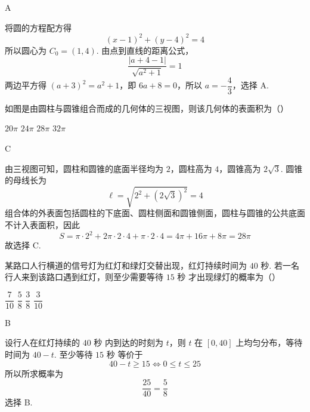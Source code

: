 \begin{answer}
A
\end{answer}

\begin{solution}
将圆的方程配方得
\[
(x-1)^2+(y-4)^2=4
\]
所以圆心为 \(C_0=(1,4)\). 由点到直线的距离公式，
\[
\frac{|a+4-1|}{\sqrt{a^2+1}}=1
\]
两边平方得 \((a+3)^2=a^2+1\)，即 \(6a+8=0\)，所以 \(a=-\dfrac43\)，选择 A.
\end{solution}


\begin{problem}
如图是由圆柱与圆锥组合而成的几何体的三视图，则该几何体的表面积为（\quad）

\begingroup
{}
\endgroup

\choices
    {\(20\pi\)}
    {\(24\pi\)}
    {\(28\pi\)}
    {\(32\pi\)}
\end{problem}

\begin{answer}
C
\end{answer}

\begin{solution}
由三视图可知，圆柱和圆锥的底面半径均为 \(2\)，圆柱高为 \(4\)，圆锥高为 \(2\sqrt3\). 圆锥的母线长为
\[
\ell=\sqrt{2^2+(2\sqrt3)^2}=4
\]
组合体的外表面包括圆柱的下底面、圆柱侧面和圆锥侧面，圆柱与圆锥的公共底面不计入表面积，因此
\[
S=\pi\cdot2^2+2\pi\cdot2\cdot4+\pi\cdot2\cdot4=4\pi+16\pi+8\pi=28\pi
\]
故选择 C.
\end{solution}


\begin{problem}
某路口人行横道的信号灯为红灯和绿灯交替出现，红灯持续时间为 \(40\text{ 秒}\). 若一名行人来到该路口遇到红灯，则至少需要等待 \(15\text{ 秒}\) 才出现绿灯的概率为（\quad）

\choices
    {\(\dfrac{7}{10}\)}
    {\(\dfrac{5}{8}\)}
    {\(\dfrac{3}{8}\)}
    {\(\dfrac{3}{10}\)}
\end{problem}

\begin{answer}
B
\end{answer}

\begin{solution}
设行人在红灯持续的 \(40\text{ 秒}\) 内到达的时刻为 \(t\)，则 \(t\) 在 \([0,40]\) 上均匀分布，等待时间为 \(40-t\). 至少等待 \(15\text{ 秒}\) 等价于
\[
40-t\geq15\Longleftrightarrow 0\leq t\leq25
\]
所以所求概率为
\[
\frac{25}{40}=\frac58
\]
选择 B.
\end{solution}


